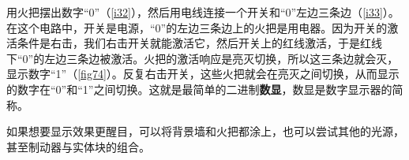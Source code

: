 \begin{example}
用火把摆出数字“0”（\autoref{i32}），然后用电线连接一个开关和“0”左边三条边（\autoref{i33}）。在这个电路中，开关是电源，“0”的左边三条边上的火把是用电器。因为开关的激活条件是右击，我们右击开关就能激活它，然后开关上的红线激活，于是红线下“0”的左边三条边被激活。火把的激活响应是亮灭切换，所以这三条边就会灭，显示数字“1”（\autoref{fig74}）。反复右击开关，这些火把就会在亮灭之间切换，从而显示的数字在“0”和“1”之间切换。这就是最简单的二进制\textbf{数显}，数显是数字显示器的简称。

\begin{figure}[!ht]
\begin{center}
\qquad\qquad
{}
\qquad\qquad
{}
\end{center}
\caption{}
\label{i32:33}
\end{figure}
\begin{remark}
如果想要显示效果更醒目，可以将背景墙和火把都涂上，也可以尝试其他的光源，甚至制动器与实体块的组合。
\end{remark}
\end{example}


